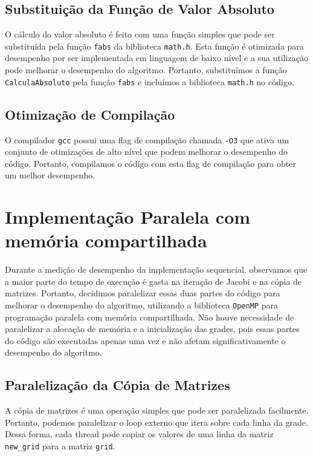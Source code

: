 \documentclass[conference]{IEEEtran}
\begin{document}
\subsection{Substituição da Função de Valor Absoluto}

O cálculo do valor absoluto é feito com uma função simples que pode ser substituída pela função \texttt{fabs} da biblioteca \texttt{math.h}. Esta função é otimizada para desempenho por ser implementada em linguagem de baixo nível e a sua utilização pode melhorar o desempenho do algoritmo. Portanto, substituímos a função \texttt{CalculaAbsoluto} pela função \texttt{fabs} e incluímos a biblioteca \texttt{math.h} no código.

\subsection{Otimização de Compilação}

O compilador \texttt{gcc} possui uma flag de compilação chamada \texttt{-O3} que ativa um conjunto de otimizações de alto nível que podem melhorar o desempenho do código. Portanto, compilamos o código com esta flag de compilação para obter um melhor desempenho.


\section{Implementação Paralela com memória compartilhada}

Durante a medição de desempenho da implementação sequencial, observamos que a maior parte do tempo de execução é gasta na iteração de Jacobi e na cópia de matrizes. Portanto, decidimos paralelizar essas duas partes do código para melhorar o desempenho do algoritmo, utilizando a biblioteca \texttt{OpenMP} para programação paralela com memória compartilhada. Não houve necessidade de paralelizar a alocação de memória e a inicialização das grades, pois essas partes do código são executadas apenas uma vez e não afetam significativamente o desempenho do algoritmo.


\subsection{Paralelização da Cópia de Matrizes}

A cópia de matrizes é uma operação simples que pode ser paralelizada facilmente. Portanto, podemos paralelizar o loop externo que itera sobre cada linha da grade. Dessa forma, cada thread pode copiar os valores de uma linha da matriz \texttt{new\_grid} para a matriz \texttt{grid}.
\end{document}
